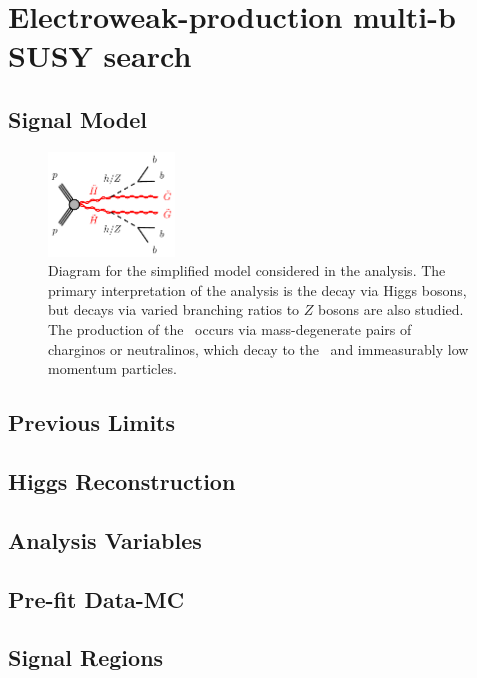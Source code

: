\chapter{Electroweak-production multi-b SUSY search}
\label{chap:ewk_prod}


\section{Signal Model}

\begin{figure}[htbp]
	\centering
	\includegraphics[width=0.3\textwidth]{figures/ewk_prod/varie/N1N1-hhGG-bbbb_Z}
	\caption{Diagram for the simplified model considered in the analysis. The primary interpretation of the analysis is the decay via Higgs bosons, but decays via varied branching ratios to $Z$ bosons are also studied. The production of the \hino\ occurs
via mass-degenerate pairs of charginos or neutralinos, which decay to the \ninoone\ and immeasurably low momentum particles.} 
	\label{fig:feyn}
\end{figure}

\section{Previous Limits}

\section{Higgs Reconstruction}

\section{Analysis Variables}


\section{Pre-fit Data-MC}


\section{Signal Regions}

